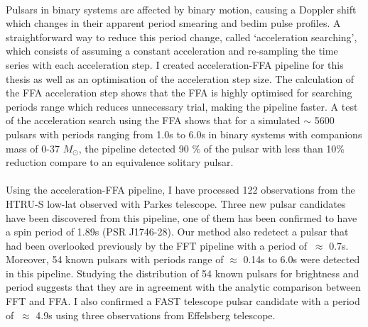 \documentclass[../chapter1/thesis_msc.tex]{subfiles}
\begin{document}
\paragraph{} Pulsars in binary systems are affected by binary motion, causing a Doppler shift which changes in their apparent period smearing and bedim pulse profiles. 
A straightforward way to reduce this period change, called `acceleration searching', which consists of assuming a constant acceleration and re-sampling the time series with each acceleration step. I created acceleration-FFA pipeline for this thesis as well as an optimisation of the acceleration step size. The calculation of the FFA acceleration step shows that the FFA is highly optimised for searching periods range which reduces unnecessary trial, making the pipeline faster. A test of the acceleration search using the FFA shows that for a simulated $\sim$ 5600 pulsars with periods ranging from 1.0s to 6.0s in binary systems with companions mass of 0-37 $M_\odot$, the pipeline detected  90 \% of the pulsar with less than 10\% reduction  compare to an equivalence solitary pulsar.  

\paragraph{} Using the acceleration-FFA pipeline, I have processed 122 observations from the HTRU-S low-lat observed with Parkes telescope.
Three new pulsar candidates have been discovered from this pipeline, one of them has been confirmed to have a spin period of 1.89s (PSR J1746-28). 
Our method also redetect a pulsar that had been overlooked previously by the FFT pipeline with a period of $~\approx$ 0.7s. Moreover, 54 known pulsars with periods range of $\approx$ 0.14s to 6.0s were detected in this pipeline. Studying the distribution of 54 known pulsars for brightness and period suggests that they are in agreement with the analytic comparison between FFT and FFA. I also confirmed a FAST telescope pulsar candidate with a period of $~\approx$ 4.9s using three observations from Effelsberg telescope. 
    
    \clearpage
    \thispagestyle{empty}
\end{document}
